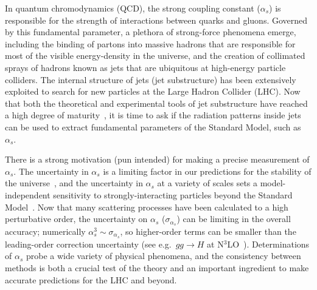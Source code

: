 
In quantum chromodynamics (QCD), the strong coupling constant ($\alpha_s$) is responsible for the strength of interactions between quarks and gluons.
%
Governed by this fundamental parameter, a plethora of strong-force phenomena emerge, including the binding of partons into massive hadrons that are responsible for most of the visible energy-density in the universe, and the creation of collimated sprays of hadrons known as jets that are ubiquitous at high-energy particle colliders.
%
The internal structure of jets (jet substructure) has been extensively exploited to search for new particles at the Large Hadron Collider (LHC).
%
Now that both the theoretical and experimental tools of jet substructure have reached a high degree of maturity~\cite{Abdesselam:2010pt,Altheimer:2012mn,Altheimer:2013yza,Adams:2015hiv,Larkoski:2017jix}, it is time to ask if the radiation patterns inside jets can be used to extract fundamental parameters of the Standard Model, such as $\alpha_s$.

There is a strong motivation (pun intended) for making a precise measurement of $\alpha_s$.
%
The uncertainty in $\alpha_s$ is a limiting factor in our predictions for the stability of the universe~\cite{Andreassen:2017rzq}, and the
uncertainty in $\alpha_s$ at a variety of scales sets a model-independent sensitivity to strongly-interacting particles beyond the Standard Model~\cite{Kaplan:2008pt,Becciolini:2014lya}.
%
Now that many scattering processes have been calculated to a high perturbative order, the uncertainty on $\alpha_s$ ($\sigma_{\alpha_s}$) can be limiting in the overall accuracy; numerically $\alpha_s^3\sim \sigma_{\alpha_s}$, so higher-order terms can be smaller than the leading-order correction uncertainty (see e.g.\ $gg\rightarrow H$ at N$^3$LO~\cite{Anastasiou:2015ema}).
%
Determinations of $\alpha_s$ probe a wide variety of physical phenomena, and the consistency between methods is both a crucial test of the theory and an important ingredient to make accurate predictions for the LHC and beyond.

